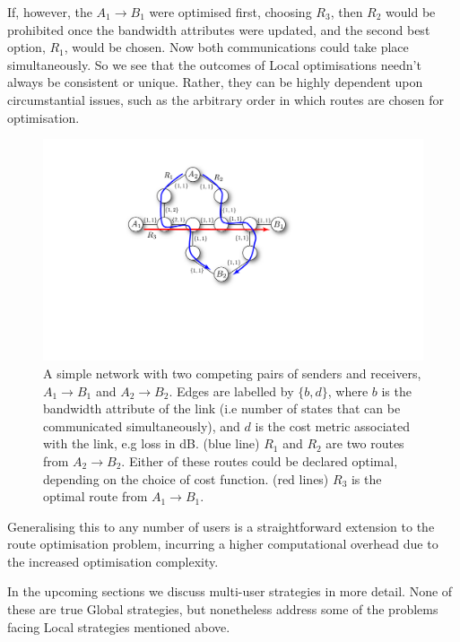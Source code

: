 \documentclass[aps,rmp,twocolumn,amsmath,amssymb,nofootinbib,superscriptaddress]{revtex4}
\begin{document}
If, however, the \mbox{$A_1\to B_1$} were optimised first, choosing $R_3$, then $R_2$ would be prohibited once the bandwidth attributes were updated, and the second best option, $R_1$, would be chosen. Now both communications could take place simultaneously. So we see that the outcomes of {\sc Local} optimisations needn't always be consistent or unique. Rather, they can be highly dependent upon circumstantial issues, such as the arbitrary order in which routes are chosen for optimisation.

\begin{figure}[!htb]
\includegraphics[width=\columnwidth]{conflict}
\caption{A simple network with two competing pairs of senders and receivers, \mbox{$A_1\to B_1$} and \mbox{$A_2\to B_2$}. Edges are labelled by \mbox{$\{b,d\}$}, where $b$ is the bandwidth attribute of the link (i.e number of states that can be communicated simultaneously), and $d$ is the cost metric associated with the link, e.g loss in dB. (blue line) $R_1$ and $R_2$ are two routes from $A_2\to B_2$. Either of these routes could be declared optimal, depending on the choice of cost function. (red lines) $R_3$ is the optimal route from \mbox{$A_1\to B_1$}.} \label{fig:conflict}
\end{figure}

Generalising this to any number of users is a straightforward extension to the route optimisation problem, incurring a higher computational overhead due to the increased optimisation complexity.

In the upcoming sections we discuss multi-user strategies in more detail. None of these are true {\sc Global} strategies, but nonetheless address some of the problems facing {\sc Local} strategies mentioned above.

%
%
\end{document}
